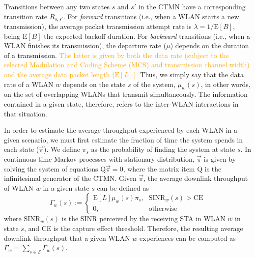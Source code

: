 \documentclass[preprint,12pt]{elsarticle}
\begin{document}
Transitions between any two states $s$ and $s'$ in the CTMN have a corresponding transition rate $R_{s,s'}$. For \textit{forward} transitions (i.e., when a WLAN starts a new transmission), the average packet transmission attempt rate is $\lambda = 1/\text{E}[B]$, being $\text{E}[B]$ the expected backoff duration. For \textit{backward} transitions (i.e., when a WLAN finishes its transmission), the departure rate ($\mu$) depends on the duration of a transmission. \textcolor{orange}{The latter is given by both the data rate (subject to the selected Modulation and Coding Scheme (MCS) and transmission channel width) and the average data packet length ($\text{E}[L]$).} Thus, we simply say that the data rate of a WLAN $w$ depends on the state $s$ of the system, $\mu_{w}(s)$, in other words, on the set of overlapping WLANs that transmit simultaneously. The information contained in a given state, therefore, refers to the inter-WLAN interactions in that situation.

In order to estimate the average throughput experienced by each WLAN in a given scenario, we must first estimate the fraction of time the system spends in each state ($\vec{\pi}$). We define $\pi_s$ as the probability of finding the system at state $s$. In continuous-time Markov processes with stationary distribution, $\vec{\pi}$ is given by solving the system of equations $\text{Q} \vec{\pi} = 0$, where the matrix item $\text{Q}$ is the infinitesimal generator of the CTMN.
Given $\vec{\pi}$, the average downlink throughput of WLAN $w$ in a given state $s$ can be defined as
\begin{equation*}
\Gamma_{w}(s) := \begin{cases} 
\text{E}[L]  \mu_w(s) \pi_s  \text{,}  & \text{SINR}_{w}(s) > \text{CE} \\
0 \text{,} & \text{otherwise}
\end{cases}
\end{equation*}
where $\text{SINR}_{w}(s)$ is the SINR perceived by the receiving STA in WLAN $w$ in state $s$, and CE is the capture effect threshold.	Therefore, the resulting average downlink throughput that a given WLAN $w$ experiences can be computed as $\Gamma_w = \sum_{s \in \mathcal{S}}^{}\Gamma_{w}(s) $.
\end{document}
